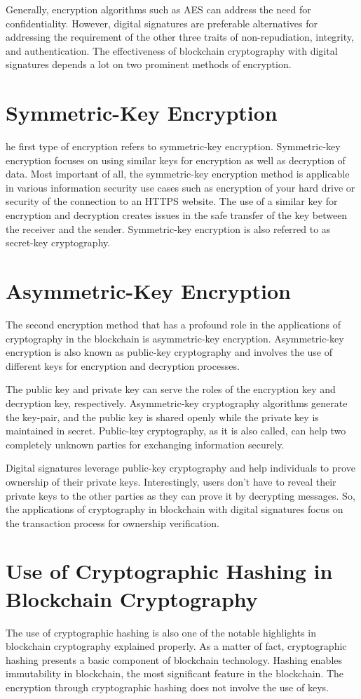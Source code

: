 \documentclass[BTech]{srmuthesis}
\begin{document}
  Generally, encryption algorithms such as AES can address the need for confidentiality. However, digital signatures are preferable alternatives for addressing the requirement of the other three traits of non-repudiation, integrity, and authentication. The effectiveness of blockchain cryptography with digital signatures depends a lot on two prominent methods of encryption.
  \section{Symmetric-Key Encryption}
  he first type of encryption refers to symmetric-key encryption. Symmetric-key encryption focuses on using similar keys for encryption as well as decryption of data. Most important of all, the symmetric-key encryption method is applicable in various information security use cases such as encryption of your hard drive or security of the connection to an HTTPS website. The use of a similar key for encryption and decryption creates issues in the safe transfer of the key between the receiver and the sender. Symmetric-key encryption is also referred to as secret-key cryptography. 

  \section{Asymmetric-Key Encryption }
  The second encryption method that has a profound role in the applications of cryptography in the blockchain is asymmetric-key encryption. Asymmetric-key encryption is also known as public-key cryptography and involves the use of different keys for encryption and decryption processes.

  The public key and private key can serve the roles of the encryption key and decryption key, respectively. Asymmetric-key cryptography algorithms generate the key-pair, and the public key is shared openly while the private key is maintained in secret. Public-key cryptography, as it is also called, can help two completely unknown parties for exchanging information securely. 

  Digital signatures leverage public-key cryptography and help individuals to prove ownership of their private keys. Interestingly, users don’t have to reveal their private keys to the other parties as they can prove it by decrypting messages. So, the applications of cryptography in blockchain with digital signatures focus on the transaction process for ownership verification. 

  \section{Use of Cryptographic Hashing in Blockchain Cryptography}
  The use of cryptographic hashing is also one of the notable highlights in blockchain cryptography explained properly. As a matter of fact, cryptographic hashing presents a basic component of blockchain technology. Hashing enables immutability in blockchain, the most significant feature in the blockchain. The encryption through cryptographic hashing does not involve the use of keys. 
\end{document}
